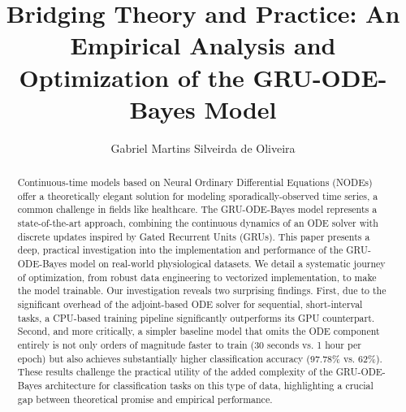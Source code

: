 \documentclass[sigconf]{acmart}
\begin{document}
\title{{Bridging Theory and Practice: An Empirical Analysis and Optimization of the GRU-ODE-Bayes Model}}



\author{Gabriel Martins Silveirda de Oliveira}


\begin{abstract}
Continuous-time models based on Neural Ordinary Differential Equations (NODEs) offer a theoretically 
elegant solution for modeling sporadically-observed time series, a common challenge in fields like healthcare. 
The GRU-ODE-Bayes model represents a state-of-the-art approach, combining the continuous dynamics of an ODE solver with 
discrete updates inspired by Gated Recurrent Units (GRUs). 
This paper presents a deep, practical investigation into the implementation and performance of the GRU-ODE-Bayes model on 
real-world physiological datasets. 
We detail a systematic journey of optimization, from robust data engineering to vectorized implementation, 
to make the model trainable. Our investigation reveals two surprising findings. 
First, due to the significant overhead of the adjoint-based ODE solver for sequential, short-interval tasks, 
a CPU-based training pipeline significantly outperforms its GPU counterpart. 
Second, and more critically, a simpler baseline model that omits the ODE component entirely is not only 
orders of magnitude faster to train (30 seconds vs. 1 hour per epoch) but also achieves substantially higher 
classification accuracy (97.78\% vs. 62\%). 
These results challenge the practical utility of the added complexity of the GRU-ODE-Bayes architecture for 
classification tasks on this type of data, highlighting a crucial gap between theoretical promise and empirical performance.
\end{abstract}
\end{document}
